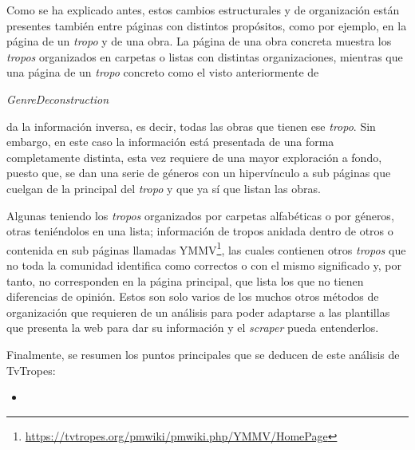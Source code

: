 Como se ha explicado antes, estos cambios estructurales y de organización están
presentes también entre páginas con distintos propósitos, como por ejemplo, en
la página de un \textit{tropo} y de una obra. La página de una obra concreta
muestra los \textit{tropos} organizados en carpetas o listas con distintas
organizaciones, mientras que una página de un \textit{tropo} concreto como el
visto anteriormente de
\begin{otherlanguage}{english}\textit{GenreDeconstruction}\end{otherlanguage} da
la información inversa, es decir, todas las obras que tienen ese \textit{tropo}.
Sin embargo, en este caso la información está presentada de una forma
completamente distinta, esta vez requiere de una mayor exploración a fondo,
puesto que, se dan una serie de géneros con un hipervínculo a sub páginas que
cuelgan de la principal del \textit{tropo} y que ya sí que listan las obras.

Algunas teniendo los \textit{tropos} organizados por carpetas alfabéticas o por
géneros, otras teniéndolos en una lista; información de tropos anidada dentro de
otros o contenida en sub páginas llamadas
YMMV\footnote{\url{https://tvtropes.org/pmwiki/pmwiki.php/YMMV/HomePage}}, las
cuales contienen otros \textit{tropos} que no toda la comunidad identifica como
correctos o con el mismo significado y, por tanto, no corresponden en la página
principal, que lista los que no tienen diferencias de opinión. Estos son solo
varios de los muchos otros métodos de organización que requieren de un análisis
para poder adaptarse a las plantillas que presenta la web para dar su
información y el \textit{scraper} pueda entenderlos.

Finalmente, se resumen los puntos principales que se deducen de este análisis de
TvTropes:
\begin{itemize}
    \item 
\end{itemize}